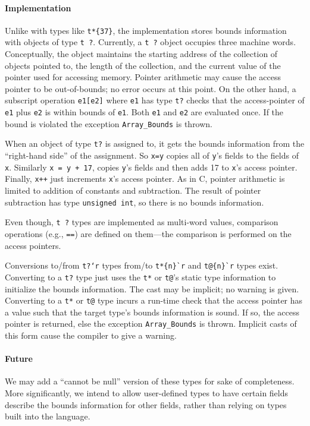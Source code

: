\paragraph{Implementation} Unlike with types like \verb|t*{37}|,
the implementation stores bounds information with objects of type
\texttt{t ?}.  Currently, a \texttt{t ?} object occupies three machine
words.  Conceptually, the object maintains the starting address of the
collection of objects pointed to, the length of the collection, and
the current value of the pointer used for accessing memory.  Pointer
arithmetic may cause the access pointer to be out-of-bounds; no error
occurs at this point.  On the other hand, a subscript operation
\texttt{e1[e2]} where \texttt{e1} has type \texttt{t?} checks that the
access-pointer of \texttt{e1} plus \texttt{e2} is within bounds of
\texttt{e1}.  Both \texttt{e1} and \texttt{e2} are evaluated once.  If the
bound is violated the exception \texttt{Array_Bounds} is thrown.

When an object of type \texttt{t?} is assigned to, it gets the bounds
information from the ``right-hand side'' of the assignment.  So
\texttt{x=y} copies all of \texttt{y}'s fields to the fields of \texttt{x}.
Similarly \texttt{x = y + 17}, copies \texttt{y}'s fields and then adds 17
to \texttt{x}'s access pointer.  Finally, \texttt{x++} just increments
\texttt{x}'s access pointer.  As in C, pointer arithmetic is limited to
addition of constants and subtraction.  The result of pointer
subtraction has type \texttt{unsigned int}, so there is no bounds
information.

Even though, \texttt{t ?} types are implemented as multi-word values,
comparison operations (e.g., \texttt{==}) are defined on them---the
comparison is performed on the access pointers.

Conversions to/from \texttt{t?`r} types from/to \verb|t*{n}`r| and
\verb|t@{n}`r| types exist.  Converting to a \texttt{t?} type just uses
the \texttt{t*} or \texttt{t@}'s static type information to initialize the
bounds information.  The cast may be implicit; no warning is given.
Converting to a \texttt{t*} or \texttt{t@} type incurs a run-time check
that the access pointer has a value such that the target type's bounds
information is sound.  If so, the access pointer is returned, else the
exception \texttt{Array_Bounds} is thrown.  Implicit casts of this form
cause the compiler to give a warning.


\paragraph{Future} We may add a ``cannot be null'' version of these types
for sake of completeness.  More significantly, we intend to allow
user-defined types to have certain fields describe the bounds
information for other fields, rather than relying on types built into
the language.


